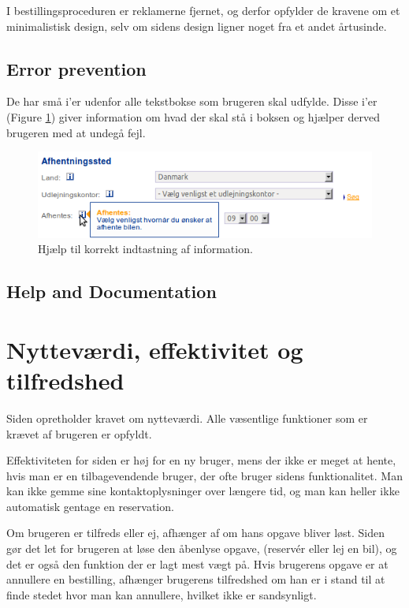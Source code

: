\documentclass[a4paper]{article}
\begin{document}
I bestillingsproceduren er reklamerne fjernet, og derfor opfylder de kravene om
et minimalistisk design, selv om sidens design ligner noget fra et andet
årtusinde.

\subsection{Error prevention}
De har små i'er udenfor alle tekstbokse som brugeren skal udfylde. Disse i'er (Figure \ref{help_kontaktinformation})
giver information om hvad der skal stå i boksen og hjælper derved brugeren med at
undegå fejl.

\begin{figure}[htbp]
  \begin{center}
    \includegraphics[scale=.6]{7.png}
  \end{center}
  \caption{Hjælp til korrekt indtastning af information.}
  \label{help_kontaktinformation}
\end{figure}

\subsection{Help and Documentation}

\section{Nytteværdi, effektivitet og tilfredshed}
Siden opretholder kravet om nytteværdi. Alle væsentlige funktioner som er krævet
af brugeren er opfyldt.

Effektiviteten for siden er høj for en ny bruger, mens der ikke er meget at
hente, hvis man er en tilbagevendende bruger, der ofte bruger sidens
funktionalitet. Man kan ikke gemme sine kontaktoplysninger over længere tid, og
man kan heller ikke automatisk gentage en reservation.

Om brugeren er tilfreds eller ej, afhænger af om hans opgave bliver løst. Siden
gør det let for brugeren at løse den åbenlyse opgave, (reservér eller lej en
bil), og det er også den funktion der er lagt mest vægt på. Hvis brugerens
opgave er at annullere en bestilling, afhænger brugerens tilfredshed om han er i
stand til at finde stedet hvor man kan annullere, hvilket ikke er sandsynligt.
\end{document}
